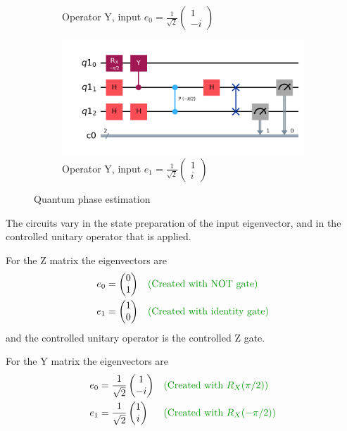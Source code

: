\documentclass[12pt]{extarticle}
\begin{document}
\begin{figure}[htbp]
\begin{subfigure}[b]{0.45\textwidth}
        \caption{Operator Y, input $e_0=\frac{1}{\sqrt{2}}\begin{pmatrix} 1 \\ -i \end{pmatrix}$}
    \end{subfigure}
    \hfill
    \begin{subfigure}[b]{0.45\textwidth}
        \centering
        \includegraphics[width=\textwidth]{images/homework3_q2_qpe_y_e1.png}
        \caption{Operator Y, input $e_1=\frac{1}{\sqrt{2}}\begin{pmatrix} 1 \\ i \end{pmatrix}$}
    \end{subfigure}
    \caption{Quantum phase estimation}
    \label{fig:homework3_q2_qpe}
\end{figure}

The circuits vary in the state preparation of the input eigenvector,
and in the controlled unitary operator that is applied.

For the Z matrix the eigenvectors are
\begin{align*}
e_0 &= \begin{pmatrix} 0 \\ 1 \end{pmatrix} && \expl{Created with NOT gate}\\
e_1 &= \begin{pmatrix} 1 \\ 0 \end{pmatrix} && \expl{Created with identity gate}\\
\end{align*}
and the controlled unitary operator is the controlled Z gate.

For the Y matrix the eigenvectors are
\begin{align*}
e_0 &= \frac{1}{\sqrt{2}}\begin{pmatrix} 1 \\ -i \end{pmatrix} && \expl{Created with $R_X(\pi/2)$}\\
e_1 &= \frac{1}{\sqrt{2}}\begin{pmatrix} 1 \\ i \end{pmatrix} && \expl{Created with $R_X(-\pi/2)$}\\
\end{align*}
\end{document}
